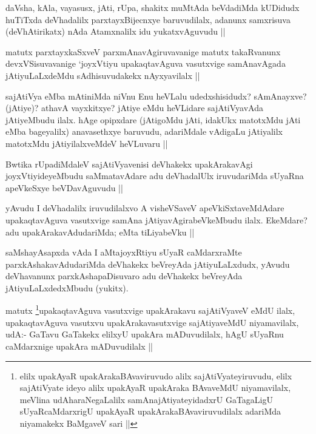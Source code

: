 \begin{artha}
daVsha, kAla, vayasusx, jAti, rUpa, shakitx muMtAda beVdadiMda kUDidudx huTiTxda deVhadalilx parxtayxBijecnxye baruvudilalx, adanunx samxrisuva (deVhAtirikatx) nAda Atamxnalilx idu yukatxvAguvudu ||
\end{artha}

\begin{artha}
matutx parxtayxkaSxveV parxmAnavAgiruvavanige matutx takaRvanunx devxVSisuvavanige `joyxVtiyu upakaqtavAguva vasutxvige samAnavAgada jAtiyuLaLxdeMdu sAdhisuvudakekx nAyxyavilalx ||
\end{artha}

\begin{artha}
sajAtiVya eMba mAtiniMda niVnu Enu heVLalu udedxshisidudx? sAmAnayxve? (jAtiye)? athavA vayxkitxye? jAtiye eMdu heVLidare sajAtiVyavAda jAtiyeMbudu ilalx. hAge opipxdare (jAtigoMdu jAti, idakUkx matotxMdu jAti eMba bageyalilx) anavasethxye baruvudu, adariMdale vAdigaLu jAtiyalilx matotxMdu jAtiyilalxveMdeV heVLuvaru ||
\end{artha}

\begin{artha}
Bwtika rUpadiMdaleV sajAtiVyavenisi deVhakekx upakArakavAgi joyxVtiyideyeMbudu saMmatavAdare adu deVhadalUlx iruvudariMda sUyaRna apeVkeSxye beVDavAguvudu ||
\end{artha}

\begin{artha}
yAvudu I deVhadalilx iruvudilalxvo A visheVSaveV apeVkiSxtaveMdAdare upakaqtavAguva vasutxvige samAna jAtiyavAgirabeVkeMbudu ilalx. EkeMdare? adu upakArakavAdudariMda; eMta tiLiyabeVku ||
\end{artha}

\begin{artha}
saMshayAsapxda vAda I aMtajoyxRtiyu sUyaR caMdarxraMte parxkAshakavAdudariMda deVhakekx beVreyAda jAtiyuLaLxdudx, yAvudu deVhavanunx parxkAshapaDisuvaro adu deVhakekx beVreyAda jAtiyuLaLxdedxMbudu (yukitx).
\end{artha}

\begin{artha}
matutx \footnote{elilx upakAyaR upakArakaBAvaviruvudo alilx sajAtiVyateyiruvudu, elilx sajAtiVyate ideyo alilx upakAyaR upakAraka BAvaveMdU niyamavilalx, meVlina udAharaNegaLalilx samAnajAtiyateyidadxrU GaTagaLigU sUyaRcaMdarxrigU upakAyaR upakArakaBAvaviruvudilalx adariMda niyamakekx BaMgaveV sari ||}upakaqtavAguva vasutxvige upakArakavu sajAtiVyaveV eMdU ilalx, upakaqtavAguva vasutxvu upakArakavasutxvige sajAtiyaveMdU niyamavilalx, udA:- GaTavu GaTakekx elilxyU upakAra mADuvudilalx, hAgU sUyaRnu caMdarxnige upakAra mADuvudilalx ||
\end{artha}

